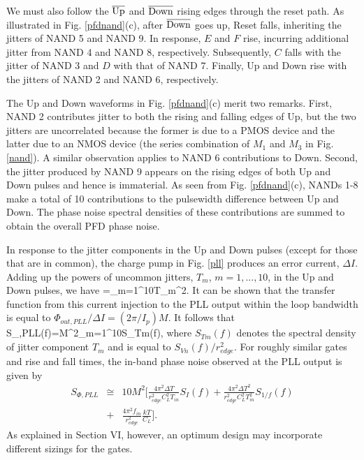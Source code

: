We must also follow the $\overline{\rm Up}$ and $\overline{\rm Down}$ rising edges through the reset path. As illustrated in Fig.
\ref{pfdnand}(c), after $\overline{\rm Down}$ goes up, Reset falls, inheriting the jitters of NAND 5 and NAND 9. In response, $E$
and $F$ rise, incurring additional jitter from NAND 4 and NAND 8, respectively. Subsequently, $C$ falls with the jitter
of NAND 3 and $D$ with that of NAND 7. Finally, Up and Down rise with the jitters of NAND 2 and NAND 6,
respectively.

The Up and Down waveforms in Fig. \ref{pfdnand}(c) merit two remarks. First, NAND 2 contributes jitter to both the rising
and falling edges of Up, but the two jitters are uncorrelated because the former is due to a PMOS device and the latter
due to an NMOS device (the series combination of $M_1$ and $M_3$ in Fig. \ref{nand}). A similar observation applies to NAND 6
contributions to Down. Second, the jitter produced by NAND 9 appears on the rising edges of both Up and
Down pulses and hence is immaterial.
As seen from Fig. \ref{pfdnand}(c), NANDs 1-8 make a total of 10 contributions to the pulsewidth
difference between Up and Down. The phase noise spectral densities of these contributions
are summed to obtain the overall PFD phase noise. 

{In response to the jitter components in the Up and Down pulses (except for those that are in common), the charge pump in Fig.
\ref{pll} produces an error current, $\Delta I$.
Adding up the powers of uncommon jitters, $T_m$, $m=1,...,10$, in the Up and Down pulses, we have
\beq
{}=\sum_{m=1}^{10}T_m^2.
\label{deltai2}
\eeq
It can be shown that the transfer function from this current injection to the PLL output within the loop bandwidth is equal to $\Phi_{out,
PLL}/\Delta I =(2\pi/I_p)M$. It follows that 
\beq
S_{\Phi,PLL}(f)=M^2\sum_{m=1}^{10}S_{Tm}(f),
\label{sphipll0}
\eeq
where $S_{Tm}(f)$ denotes the spectral density of jitter component $T_m$ and is equal to $S_{Vn}(f)/r_{edge}^2$.
}
For roughly similar gates and rise and fall times, the in-band phase noise observed at the PLL output is given by
\begin{eqnarray}
S_{\Phi,PLL}\!\!\!\!&\cong&\!\!\!\! 10 M^2 [\frac{4\pi^2{\Delta T}}{r_{edge}^2 C_L^2 T_{in}}S_{I}(f) + \frac{4\pi^2{\Delta T}^2}{r_{edge}^2 C_L^2 T_{in}^2}S_{1/f}(f)\nonumber  \\ 
&+&\!\!\!\!\frac{4 \pi^2 f_{in}}{r_{edge}^2}\frac{kT}{C_L}].
\label{sphipll}
\end{eqnarray}
As explained in Section VI, however, an optimum design may incorporate different sizings for the gates. 


